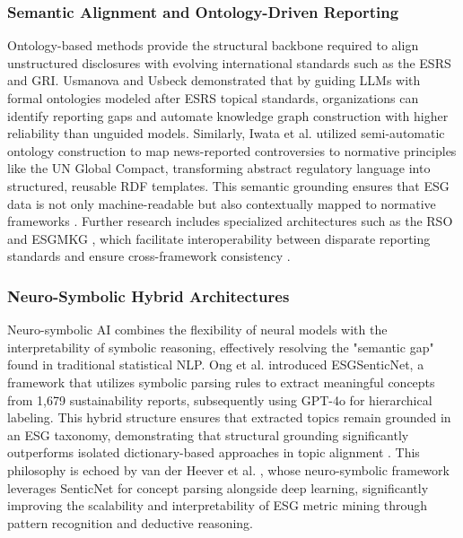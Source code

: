 \documentclass{article}
\begin{document}
\subsubsection{Semantic Alignment and Ontology-Driven Reporting}

Ontology-based methods provide the structural backbone required to align unstructured disclosures with evolving international standards such as the ESRS and GRI. Usmanova and Usbeck  \parencite{aida_usmanova_e9b44e1d} demonstrated that by guiding LLMs with formal ontologies modeled after ESRS topical standards, organizations can identify reporting gaps and automate knowledge graph construction with higher reliability than unguided models. Similarly, Iwata et al.  \parencite{tsuyoshi_iwata_18ccc0b8} utilized semi-automatic ontology construction to map news-reported controversies to normative principles like the UN Global Compact, transforming abstract regulatory language into structured, reusable RDF templates. This semantic grounding ensures that ESG data is not only machine-readable but also contextually mapped to normative frameworks  \parencite{tsuyoshi_iwata_18ccc0b8}. Further research includes specialized architectures such as the RSO  \parencite{yuchen_zhou_b6beee03} and ESGMKG  \parencite{mingqin_yu_96a5b8af}, which facilitate interoperability between disparate reporting standards and ensure cross-framework consistency  \parencite{annas_vijaya_dc57c7ec}.
\subsubsection{Neuro-Symbolic Hybrid Architectures}

Neuro-symbolic AI combines the flexibility of neural models with the interpretability of symbolic reasoning, effectively resolving the "semantic gap" found in traditional statistical NLP. Ong et al.  \parencite{keane_ong_8fec4760} introduced ESGSenticNet, a framework that utilizes symbolic parsing rules to extract meaningful concepts from 1,679 sustainability reports, subsequently using GPT-4o for hierarchical labeling. This hybrid structure ensures that extracted topics remain grounded in an ESG taxonomy, demonstrating that structural grounding significantly outperforms isolated dictionary-based approaches in topic alignment  \parencite{keane_ong_8fec4760}. This philosophy is echoed by van der Heever et al.  \parencite{wihan_van_der_heever_5ff35709}, whose neuro-symbolic framework leverages SenticNet for concept parsing alongside deep learning, significantly improving the scalability and interpretability of ESG metric mining through pattern recognition and deductive reasoning.
\end{document}

